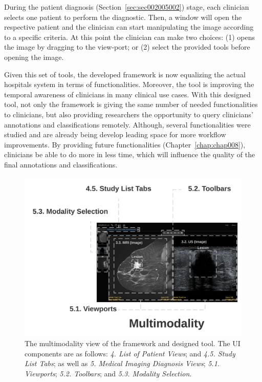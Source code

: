 
During the patient diagnosis (Section~\ref{sec:sec002005002}) stage, each clinician selects one patient to perform the diagnostic.
Then, a window will open the respective patient and the clinician can start manipulating the image according to a specific criteria.
At this point the clinician can make two choices: (1) opens the image by dragging to the view-port; or (2) select the provided tools before opening the image.

Given this set of tools, the developed framework is now equalizing the actual hospitals system in terms of functionalities.
Moreover, the tool is improving the temporal awareness of clinicians in many clinical use cases.
With this designed tool, not only the framework is giving the same number of needed functionalities to clinicians, but also providing researchers the opportunity to query clinicians' annotations and classifications remotely.
Although, several functionalities were studied and are already being develop leading space for more workflow improvements.
By providing future functionalities (Chapter~\ref{chap:chap008}), clinicians be able to do more in less time, which will influence the quality of the final annotations and classifications.

\begin{figure}[ht]
\centering
\includegraphics[width=\textwidth]{images/fig028}
\caption{The multimodality view of the framework and designed tool. The UI components are as follows: {\it 4. List of Patient Views}; and {\it 4.5. Study List Tabs}; as well as {\it 5. Medical Imaging Diagnosis Views}; {\it 5.1. Viewports}; {\it 5.2. Toolbars}; and {\it 5.3. Modality Selection}.}
\label{fig:fig028}
\end{figure}

